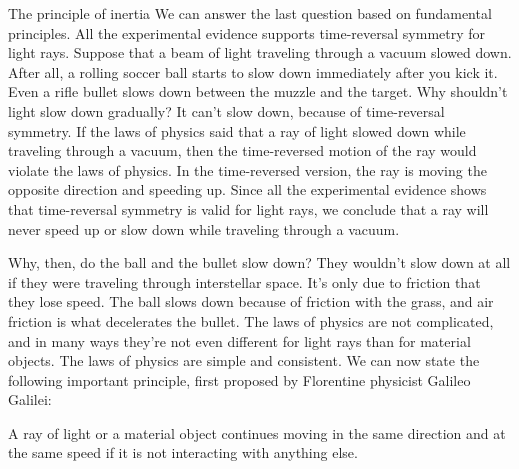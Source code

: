 \begin{envsubsection}{The principle of inertia}
We can answer the last question based on fundamental principles.
All the experimental evidence supports time-reversal symmetry for light rays.
Suppose that a beam of light traveling through a vacuum slowed down. After all,
a rolling soccer ball starts to slow down immediately after you kick it. Even
a rifle bullet slows down between the muzzle and the target.
Why shouldn't light slow down gradually? It can't slow down, because of
time-reversal symmetry. If the laws of physics said that
a ray of light slowed down while traveling through
a vacuum, then the time-reversed motion of the ray would violate the laws of
physics. In the time-reversed version, the ray is moving the opposite direction
and speeding up. Since all the experimental evidence shows that time-reversal
symmetry is valid for light rays, we conclude that a ray will never speed up
or slow down while traveling through a vacuum.

Why, then, do the ball and the bullet slow down? They wouldn't slow
down at all if they were traveling through interstellar space. It's only due to friction
that they lose speed. The ball slows down because of friction with the grass, and air
friction is what decelerates the bullet. The laws of physics are not complicated, and
in many ways they're not even different for light rays than for material objects. The laws of
physics are simple and consistent. We can now state the following important
principle, first proposed by Florentine physicist Galileo Galilei:\label{weak-principle-of-inertia}

\begin{important}
A ray of light or a material object continues moving in the same direction and
at the same speed if it is not interacting with anything else.
\end{important}
\end{envsubsection}
%
